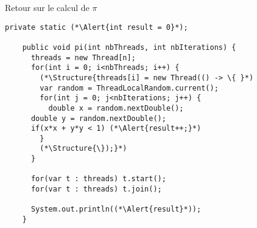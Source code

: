 
\begingroup

\begin{frame}[fragile]{Retour sur le calcul de $\pi$}

  \begin{lstlisting}[gobble=4]
    private static (*\Alert{int result = 0}*);

    public void pi(int nbThreads, int nbIterations) {
      threads = new Thread[n];
      for(int i = 0; i<nbThreads; i++) {
        (*\Structure{threads[i] = new Thread(() -> \{ }*)
        var random = ThreadLocalRandom.current();
        for(int j = 0; j<nbIterations; j++) {
          double x = random.nextDouble();
	  double y = random.nextDouble();
	  if(x*x + y*y < 1) (*\Alert{result++;}*)
        }
        (*\Structure{\});}*)
      }
      
      for(var t : threads) t.start();
      for(var t : threads) t.join();
      
      System.out.println((*\Alert{result}*));
    }
  \end{lstlisting}


\end{frame}

\endgroup
\endinput
